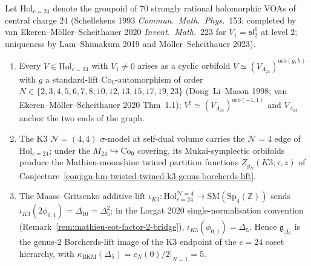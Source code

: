 \begin{proposition}[The \texorpdfstring{$c = 24$}{c = 24} holomorphic-VOA coset/orbifold hierarchy and \texorpdfstring{$\Delta_5$}{Delta-5} as its K3-side genus-\texorpdfstring{$2$}{2} lift]
\label{prop:c24-coset-hierarchy-delta5-genus2-lift}
Let $\mathrm{Hol}_{c=24}$ denote the groupoid of $70$ strongly rational
holomorphic VOAs of central charge $24$ (Schellekens 1993
\emph{Commun.~Math.~Phys.}~153; completed by van Ekeren--M\"oller--Scheithauer
2020 \emph{Invent.~Math.}~223 for $V_1 = \mathfrak{sl}_2^6$ at level $2$;
uniqueness by Lam--Shimakura 2019 and M\"oller--Scheithauer 2023).
\begin{enumerate}
\item Every $V\in\mathrm{Hol}_{c=24}$ with $V_1\ne 0$ arises as a cyclic
orbifold $V \simeq (V_{\Lambda_{24}})^{\mathrm{orb}(g,h)}$ with $g$ a
standard-lift $\mathrm{Co}_0$-automorphism of order
$N\in\{2,3,4,5,6,7,8,10,12,13,15,17,19,23\}$
(Dong--Li--Mason 1998; van Ekeren--M\"oller--Scheithauer 2020 Thm~1.1);
$V^\natural \simeq (V_{\Lambda_{24}})^{\mathrm{orb}(-1, 1)}$ and
$V_{\Lambda_{24}}$ anchor the two ends of the graph.
\item The K3 $\mathcal{N}{=}(4,4)$ $\sigma$-model at self-dual volume
carries the $\mathcal{N}{=}4$ edge of $\mathrm{Hol}_{c=24}$; under the
$M_{24}\hookrightarrow\mathrm{Co}_0$ covering, its Mukai-symplectic
orbifolds produce the Mathieu-moonshine twined partition functions
$Z_{g_N}(K3;\tau,z)$ of
Conjecture~\ref{conj:gn-hm-twisted-twined-k3-genus-borcherds-lift}.
\item The Maass--Gritsenko additive lift
$\iota_{K3}\colon \mathrm{Hol}_{c=24}^{\mathcal{N}{=}4}\to
\mathrm{SM}(\mathrm{Sp}_4(\mathbb{Z}))$ sends
$\iota_{K3}(2\phi_{0,1}) = \Delta_{10} = \Delta_5^2$;
in the Lorgat 2020 single-normalisation convention
(Remark~\ref{rem:mathieu-eot-factor-2-bridge}),
$\iota_{K3}(\phi_{0,1}) = \Delta_5$. Hence
$\mathfrak{g}_{\Delta_5}$ is the genus-$2$ Borcherds-lift image of the
K3 endpoint of the $c = 24$ coset hierarchy, with
$\kappa_{\mathrm{BKM}}(\Delta_5) = c_N(0)/2|_{N=1} = 5$.
\end{enumerate}
\end{proposition}


